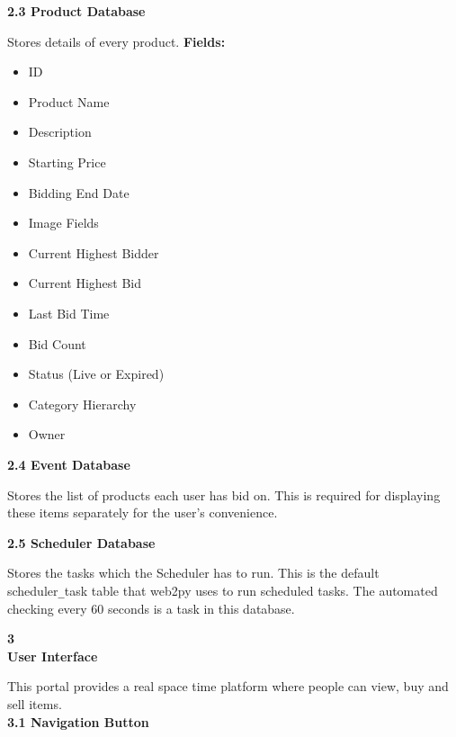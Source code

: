 \documentclass[a4paper,12pt]{article}
\begin{document}
\large{\textbf{2.3 Product Database}} \\ \vspace{5pt}

\hspace{15pt} Stores details of every product. \newline \newline
\textbf{Fields:}

\begin{itemize}
 \item ID
 \item Product Name
 \item Description
 \item Starting Price
 \item Bidding End Date
 \item Image Fields
 \item Current Highest Bidder
 \item Current Highest Bid
 \item Last Bid Time
 \item Bid Count
 \item Status (Live or Expired)
 \item Category Hierarchy 
 \item Owner
\end{itemize}


\large{\textbf{2.4 Event Database}} \\ \vspace{5pt}

\hspace{15pt} Stores the list of products each user has bid on. This is required for displaying these items separately for the user's convenience. \\ \vspace{10pt}

\large{\textbf{2.5 Scheduler Database}} \\ \vspace{5pt}

\hspace{15pt} Stores the tasks which the Scheduler has to run. This is the default scheduler\texttt{\_}task table that web2py uses to run scheduled tasks. The automated checking every 60 seconds is a task in this database. \newpage


\huge{\textbf{3 \\ User Interface}} \vspace{12pt}

\hspace{15pt}\normalsize This portal provides a real space time platform where people can view, buy and sell items.\\ \vspace{5pt}
\large{\textbf{3.1 Navigation Button}} \vspace{5pt}
\end{document}
